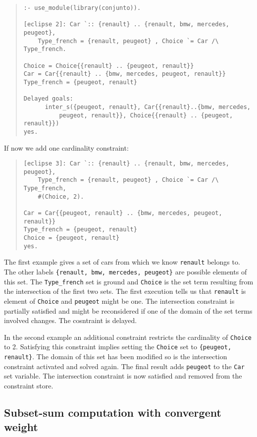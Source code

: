 \begin{quote}\begin{verbatim}
:- use_module(library(conjunto)).

[eclipse 2]: Car `:: {renault} .. {renault, bmw, mercedes, peugeot},
    Type_french = {renault, peugeot} , Choice `= Car /\ Type_french.

Choice = Choice{{renault} .. {peugeot, renault}}
Car = Car{{renault} .. {bmw, mercedes, peugeot, renault}}
Type_french = {peugeot, renault}

Delayed goals:
      inter_s({peugeot, renault}, Car{{renault}..{bmw, mercedes,
          peugeot, renault}}, Choice{{renault} .. {peugeot, renault}})
yes.
\end{verbatim}\end{quote}
If now we add one cardinality constraint:
\begin{quote}\begin{verbatim}
[eclipse 3]: Car `:: {renault} .. {renault, bmw, mercedes, peugeot},
    Type_french = {renault, peugeot} , Choice `= Car /\ Type_french,
    #(Choice, 2).

Car = Car{{peugeot, renault} .. {bmw, mercedes, peugeot, renault}}
Type_french = {peugeot, renault}
Choice = {peugeot, renault}
yes.
\end{verbatim}\end{quote}
The first example gives a set of cars from which we know
\verb/renault/ belongs to. The other labels
\verb/{renault, bmw, mercedes, peugeot}/ are possible elements of this set. The
\verb/Type_french/ set is ground and
\verb/Choice/ is the set term resulting from the intersection of the
first two sets. The first execution tells us that 
\verb/renault/ is element of \verb/Choice/ and \verb/peugeot/ might be
one. The intersection constraint is partially satisfied and might be
reconsidered if one of the domain of the set terms involved changes.
The cosntraint is  delayed.

In the second example an additional constraint restricts the cardinality of
\verb/Choice/ to 2. Satisfying this constraint implies setting the
\verb/Choice/ set to \verb/{peugeot, renault}/. The domain of this
set has been modified so is the intersection constraint activated and
solved again. The final result adds \verb/peugeot/ to the \verb/Car/
set variable. The intersection constraint is now satisfied and removed
from the constraint store.

\subsection{Subset-sum computation with convergent weight}

